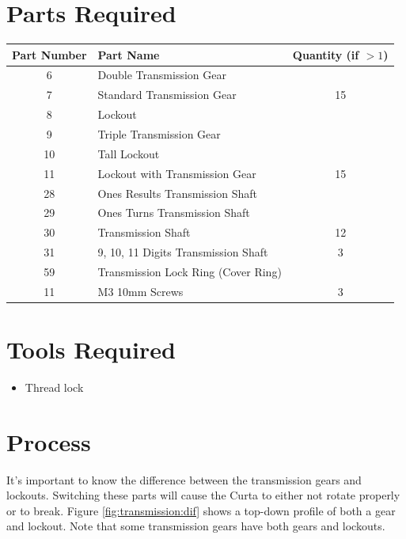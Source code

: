 \documentclass[openany]{book}
\begin{document}
\section{Parts Required}
\begin{table}[!ht]
	\centering
	\begin{tabular}{clc}
		Part Number & Part Name & Quantity (if $>1$) \\ \hline
		6 & Double Transmission Gear &  \\
		7 & Standard Transmission Gear & 15 \\
		8 & Lockout &  \\
		9 & Triple Transmission Gear & \\
		10 & Tall Lockout & \\
		11 & Lockout with Transmission Gear & 15 \\
		28 & Ones Results Transmission Shaft & \\
		29 & Ones Turns Transmission Shaft & \\
		30 & Transmission Shaft & 12 \\
		31 & 9, 10, 11 Digits Transmission Shaft & 3 \\
		59 & Transmission Lock Ring (Cover Ring) & \\ \hline \hline
		11 & M3 10mm Screws & 3
	\end{tabular}
\end{table}

\section{Tools Required}
\begin{itemize} 
	\item Thread lock
\end{itemize}

\section{Process}
It's important to know the difference between the transmission gears and lockouts. Switching these
parts will cause the Curta to either not rotate properly or to break. Figure \ref{fig:transmission:dif}
shows a top-down profile of both a gear and lockout. Note that some transmission gears have both
gears and lockouts.
\end{document}

